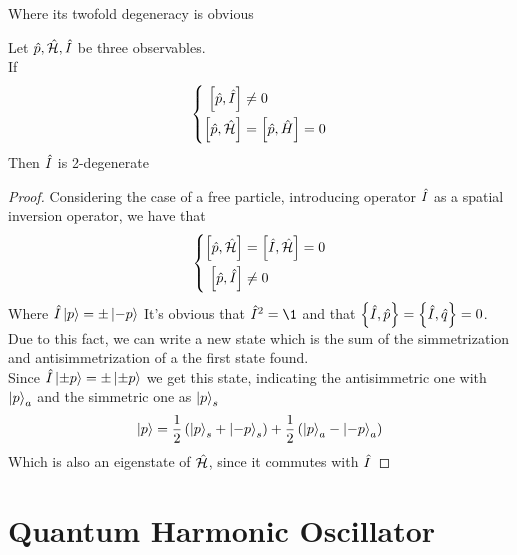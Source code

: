 \documentclass[../qm.tex]{subfiles}
\begin{document}
	Where its twofold degeneracy is obvious
	\begin{thm}
		Let $\hat{p},\hat{\mathcal{H}},\hat{I}$ be three observables.\\
		If
		\begin{equation}
			\left\{\begin{aligned}
				\comm{\opr{p}}{\opr{I}}&\ne0\\
				\comm{\opr{p}}{\opr{\ham}}&=\comm{\opr{p}}{\opr{H}}=0
			\end{aligned}\right.
			\label{eq:nondeg}
		\end{equation}
		Then $\hat{I}$ is 2-degenerate
	\end{thm}
	\begin{proof}
		Considering the case of a free particle, introducing operator $\hat{I}$ as a spatial inversion operator, we have that
		\begin{equation*}
			\left\{ \begin{aligned}
					\comm{\opr{p}}{\opr{\ham}}&=\comm{\opr{I}}{\opr{\ham}}=0\\
					\comm{\opr{p}}{\opr{I}}&\ne0
			\end{aligned}\right.
		\end{equation*}
		Where $\hat{I}\ket{p}=\pm\ket{-p}$
		It's obvious that $\opr{I}^2=\1$ and that $\acomm{\opr{I}}{\opr{p}}=\acomm{\opr{I}}{\opr{q}}=0$.\\
		Due to this fact, we can write a new state which is the sum of the simmetrization and antisimmetrization of a the first state found.\\
		Since $\hat{I}\ket{\pm p}=\pm\ket{\pm p}$ we get this state, indicating the antisimmetric one with $\ket{p}_a$ and the simmetric one as $\ket{p}_s$
		\begin{equation}
			\ket{p}=\frac{1}{2}\left( \ket{p}_s+\ket{-p}_s \right)+\frac{1}{2}\left( \ket{p}_a-\ket{-p}_a \right)
			\label{eq:state}
		\end{equation}
		Which is also an eigenstate of $\hat{\mathcal{H}}$, since it commutes with $\hat{I}$
	\end{proof}
	\section{Quantum Harmonic Oscillator}
\end{document}
